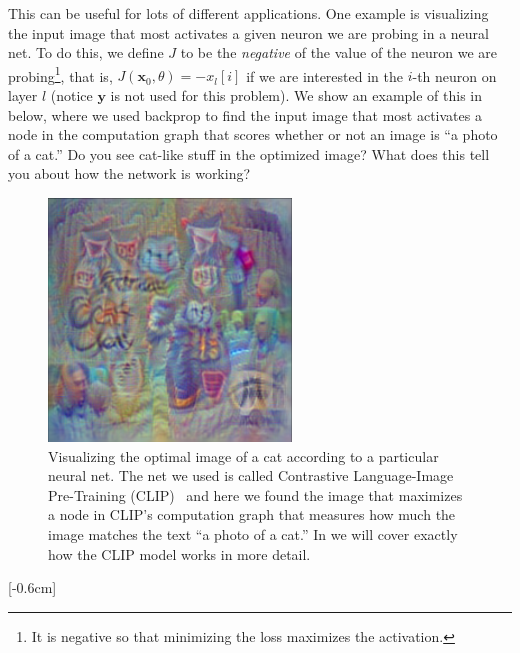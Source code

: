 This can be useful for lots of different applications. One example is visualizing the input image that most activates a given neuron we are probing in a neural net. To do this, we define $J$ to be the \textit{negative} of the value of the neuron we are probing\footnote{It is negative so that minimizing the loss maximizes the activation.}, that is, $J(\mathbf{x}_0,\theta) = -x_{l}[i]$ if we are interested in the $i$-th neuron on layer $l$ (notice $\mathbf{y}$ is not used for this problem). We show an example of this in \fig{\ref{fig:backpropagation:backprop_to_the_data_example}} below, where we used backprop to find the input image that most activates a node in the computation graph that scores whether or not an image is ``a photo of a cat.'' Do you see cat-like stuff in the optimized image? What does this tell you about how the network is working?
\begin{figure}[h!]
    \centerline{
    \includegraphics[width=.45\linewidth]{./figures/backpropagation/backprop_to_the_data_example.png}
    }
    \caption{Visualizing the optimal image of a cat according to a particular neural net. The net we used is called Contrastive Language-Image Pre-Training (CLIP)~\cite{radford2021learning} and here we found the image that maximizes a node in CLIP's computation graph that measures how much the image matches the text ``a photo of a cat.'' In \chap{\ref{chapter:VLMs}} we will cover exactly how the CLIP model works in more detail.}
    \label{fig:backpropagation:backprop_to_the_data_example}
\end{figure}

[-0.6cm]

